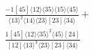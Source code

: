 \documentclass[varwidth, border=5pt]{standalone}
\begin{document}
\begin{my}
$\begin{gathered}
\scriptscriptstyle\frac{-1[45]⟨12⟩⟨35⟩⟨15⟩⟨45⟩}{⟨13⟩^2⟨14⟩⟨23⟩[23]⟨34⟩}+\\
\scriptscriptstyle\frac{1[45]⟨12⟩⟨35⟩^2⟨45⟩[24]}{[12]⟨13⟩^3⟨23⟩[23]⟨34⟩}\phantom{+}
\end{gathered}$
\end{my}
\end{document}
